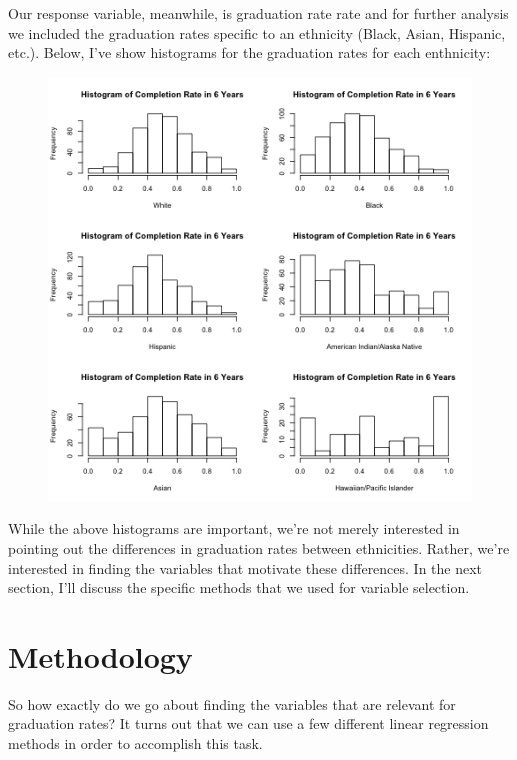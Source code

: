 \documentclass{article}
\begin{document}
Our response variable, meanwhile, is graduation rate rate and for further analysis we included the graduation rates specific to an ethnicity (Black, Asian, Hispanic, etc.). Below, I've show histograms for the graduation rates for each enthnicity:


\begin{figure}[!htb]
\includegraphics{../images/histogram_race_completion.png}
\end{figure}

While the above histograms are important, we're not merely interested in pointing out the differences in graduation rates between ethnicities. Rather, we're interested in finding the variables that motivate these differences. In the next section, I'll discuss the specific methods that we used for variable selection.


\section{Methodology}

So how exactly do we go about finding the variables that are relevant for graduation rates? It turns out that we can use a few different linear regression methods in order to accomplish this task.\\
\end{document}
